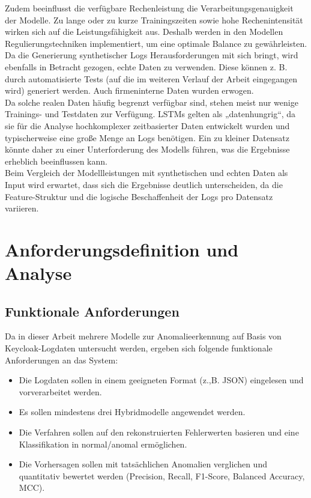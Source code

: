 \documentclass[a4paper,12pt]{article}
\begin{document}
	Zudem beeinflusst die verfügbare Rechenleistung die Verarbeitungsgenauigkeit der Modelle. Zu lange oder zu kurze Trainingszeiten sowie hohe Rechenintensität wirken sich auf die Leistungsfähigkeit aus. Deshalb werden in den Modellen Regulierungstechniken implementiert, um eine optimale Balance zu gewährleisten.
	\\[0.5em]
	Da die Generierung synthetischer Logs Herausforderungen mit sich bringt, wird ebenfalls in Betracht gezogen, echte Daten zu verwenden. Diese können z. B. durch automatisierte Tests (auf die im weiteren Verlauf der Arbeit eingegangen wird) generiert werden. Auch firmeninterne Daten wurden erwogen.
	\\[0.5em]
	Da solche realen Daten häufig begrenzt verfügbar sind, stehen meist nur wenige Trainings- und Testdaten zur Verfügung. LSTMs gelten als „datenhungrig“, da sie für die Analyse hochkomplexer zeitbasierter Daten entwickelt wurden und typischerweise eine große Menge an Logs benötigen. Ein zu kleiner Datensatz könnte daher zu einer Unterforderung des Modells führen, was die Ergebnisse erheblich beeinflussen kann.
	\\[0.5em]
	Beim Vergleich der Modellleistungen mit synthetischen und echten Daten als Input wird erwartet, dass sich die Ergebnisse deutlich unterscheiden, da die Feature-Struktur und die logische Beschaffenheit der Logs pro Datensatz variieren.
	
	\section{Anforderungsdefinition und Analyse}
	\subsection{Funktionale Anforderungen}
	Da in dieser Arbeit mehrere Modelle zur Anomalieerkennung auf Basis von Keycloak-Logdaten untersucht werden, ergeben sich folgende funktionale Anforderungen an das System:
	\begin{itemize}
		\item Die Logdaten sollen in einem geeigneten Format (z.,B. JSON) eingelesen und vorverarbeitet werden.
		
		\item Es sollen mindestens drei Hybridmodelle angewendet werden.
		
		\item Die Verfahren sollen auf den rekonstruierten Fehlerwerten basieren und eine Klassifikation in normal/anomal ermöglichen.
		
		\item Die Vorhersagen sollen mit tatsächlichen Anomalien verglichen und quantitativ bewertet werden (Precision, Recall, F1-Score, Balanced Accuracy, MCC).
		
	\end{itemize}
\end{document}
